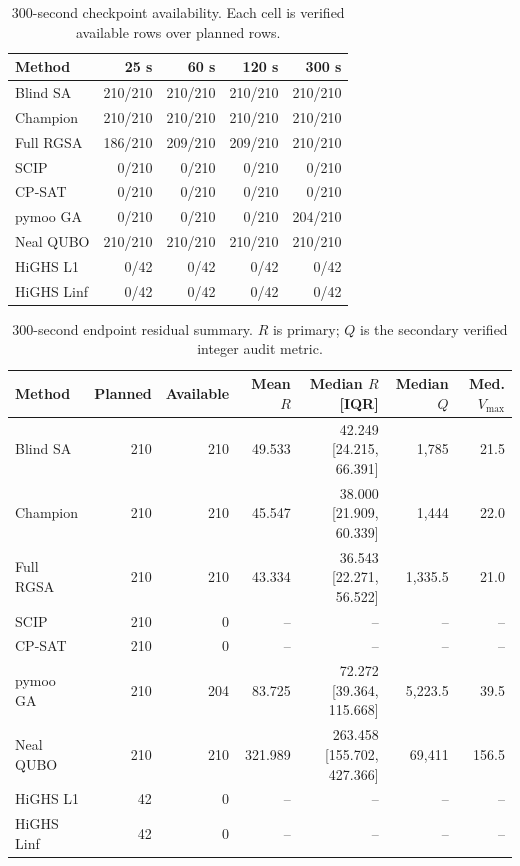 \documentclass[11pt]{article}
\begin{document}
\begin{table}[htbp]
\centering
\caption{300-second checkpoint availability. Each cell is verified available rows over planned rows.}
\begin{tabular}{lrrrr}
\toprule
Method & 25 s & 60 s & 120 s & 300 s \\
\midrule
Blind SA & 210/210 & 210/210 & 210/210 & 210/210 \\
Champion & 210/210 & 210/210 & 210/210 & 210/210 \\
Full RGSA & 186/210 & 209/210 & 209/210 & 210/210 \\
SCIP & 0/210 & 0/210 & 0/210 & 0/210 \\
CP-SAT & 0/210 & 0/210 & 0/210 & 0/210 \\
pymoo GA & 0/210 & 0/210 & 0/210 & 204/210 \\
Neal QUBO & 210/210 & 210/210 & 210/210 & 210/210 \\
HiGHS L1 & 0/42 & 0/42 & 0/42 & 0/42 \\
HiGHS Linf & 0/42 & 0/42 & 0/42 & 0/42 \\
\bottomrule
\end{tabular}
\end{table}

\begin{table}[htbp]
\centering
\caption{300-second endpoint residual summary. $R$ is primary; $Q$ is the secondary verified integer audit metric.}
\footnotesize
\begin{tabular}{lrrrrrr}
\toprule
Method & Planned & Available & Mean $R$ & Median $R$ [IQR] & Median $Q$ & Med. $V_{\max}$ \\
\midrule
Blind SA & 210 & 210 & 49.533 & 42.249 [24.215, 66.391] & 1,785 & 21.5 \\
Champion & 210 & 210 & 45.547 & 38.000 [21.909, 60.339] & 1,444 & 22.0 \\
Full RGSA & 210 & 210 & 43.334 & 36.543 [22.271, 56.522] & 1,335.5 & 21.0 \\
SCIP & 210 & 0 & -- & -- & -- & -- \\
CP-SAT & 210 & 0 & -- & -- & -- & -- \\
pymoo GA & 210 & 204 & 83.725 & 72.272 [39.364, 115.668] & 5,223.5 & 39.5 \\
Neal QUBO & 210 & 210 & 321.989 & 263.458 [155.702, 427.366] & 69,411 & 156.5 \\
HiGHS L1 & 42 & 0 & -- & -- & -- & -- \\
HiGHS Linf & 42 & 0 & -- & -- & -- & -- \\
\bottomrule
\end{tabular}
\end{table}
\end{document}
